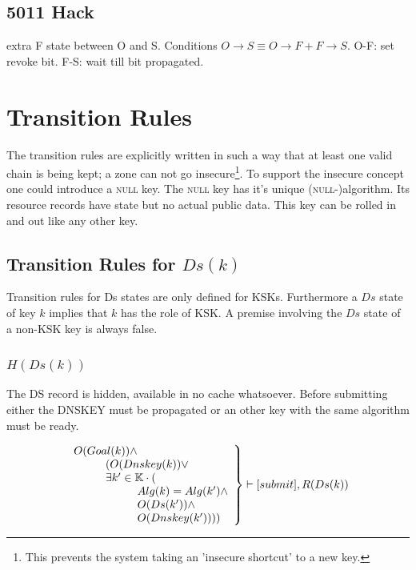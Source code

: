 \documentclass[twoside,english, a4paper]{article}
\newcommand{\mathbox}[1]{#1}
\begin{document}
\subsection{5011 Hack}

extra F state between O and S. Conditions $O\rightarrow S \equiv O\rightarrow F + F\rightarrow S$.
O-F: set revoke bit. F-S: wait till bit propagated. 

\section{Transition Rules}

The transition rules are explicitly written in such a way that at 
least one valid chain is being kept; a zone can not go insecure\footnote{
This prevents the system taking an 'insecure shortcut' to a new key.}. To support the insecure concept one could introduce a 
\textsc{null} key. The \textsc{null} key has it's unique (\textsc 
{null}-)algorithm. Its resource records have state but no actual 
public data. This key can be rolled in and out like any other key.

\subsection{Transition Rules for $Ds(k)$}

Transition rules for Ds states are only defined for KSKs. Furthermore
a $Ds$ state of key $k$ implies that $k$ has the role of KSK. A premise 
involving the $Ds$ state of a non-KSK key is always false.

\subsubsection{$H(Ds(k))$}



	
	The DS record is hidden, available in no cache whatsoever.
	Before submitting either the DNSKEY must be propagated or an other 
	key with the same algorithm must be ready.
	
	\begin{equation}
		\left.
		\begin{array}{l}
			O(Goal(k)) \wedge \\
\hskip 1cm		(O(Dnskey(k)) \vee \\
\hskip 1cm		\exists k' \in \mathbb{K} \cdot ( \\
\hskip 2cm			Alg(k)=Alg(k') \wedge \\
\hskip 2cm			O(Ds(k')) \wedge \\
\hskip 2cm			O(Dnskey(k'))))
		\end{array}
		\right\}\vdash [submit], R(Ds(k)) 
	\end{equation}
\end{document}
